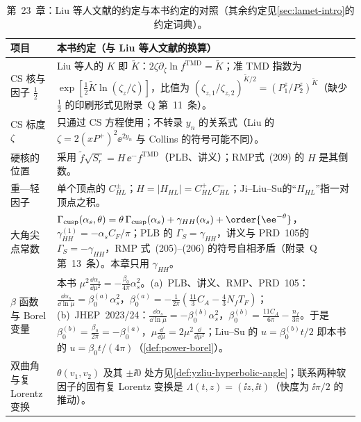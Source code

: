 \begin{table}[htbp]
\centering
\footnotesize
\renewcommand{\arraystretch}{1.1}
\begin{tabularx}{\textwidth}{@{}>{\raggedright\arraybackslash}p{2.0cm}>{\raggedright\arraybackslash}X@{}}
\toprule
项目 & 本书约定（与 Liu 等人文献的换算） \\
\midrule
CS 核与因子 $\frac12$ & Liu 等人的 $K$ 即 $\tilde K$：$2\zeta\partial_\zeta\ln f^{\mathrm{TMD}}=\tilde K$；准 TMD 指数为 $\exp[\frac12\tilde K\ln(\zeta_z/\zeta)]$，比值为 $(\zeta_{z,1}/\zeta_{z,2})^{\tilde K/2}=(P^z_1/P^z_2)^{\tilde K}$（缺少 $\frac12$ 的印刷形式见附录~Q 第~11~条）。 \\
CS 标度 $\zeta$ & 只通过 CS 方程使用；不转录 $y_n$ 的关系式（Liu 的 $\zeta=2(xP^+)^2\ee^{2y_n}$ 与 Collins 的符号可能不同）。 \\
硬核的位置 & 采用 $\tilde f\sqrt{S_r}=H\,\ee^{\cdots}f^{\mathrm{TMD}}$（PLB\cite{Ji:2019ewn}、讲义\cite{Liu:2022nnk}）；RMP\cite{JiEtAl2021}式~(209) 的 $H$ 是其倒数。 \\
重—轻因子 & 单个顶点的 $C^\pm_{HL}$；$H=|H_{HL}|=C^+_{HL}C^-_{HL}$；Ji--Liu--Su\cite{Ji:2023pba}的“$H_{HL}$”指一对顶点之积。 \\
大角尖点常数 & $\Gamma_{\mathrm{cusp}}(\alpha_s,\theta)=\theta\,\Gamma_{\mathrm{cusp}}(\alpha_s)+\gamma_{HH}(\alpha_s)+\order{\ee^{-\theta}}$，$\gamma_{HH}^{(1)}=-\alpha_sC_F/\pi$；PLB 的 $\Gamma_S=\gamma_{HH}$，讲义与 PRD~105\cite{Ji:2021znw}的 $\Gamma_S=-\gamma_{HH}$，RMP 式~(205)--(206) 的符号自相矛盾（附录~Q 第~13~条）。本章只用 $\gamma_{HH}$。 \\
$\beta$ 函数与 Borel 变量 & 本书 $\mu^2\frac{\dd\alpha_s}{\dd\mu^2}=-\frac{\beta_0}{4\pi}\alpha_s^2$。(a)~PLB、讲义、RMP、PRD~105：$\frac{\dd\alpha_s}{\dd\ln\mu}=\beta_0^{(a)}\alpha_s^2$，$\beta_0^{(a)}=-\frac{1}{2\pi}(\frac{11}{3}C_A-\frac43N_fT_F)$；(b)~JHEP~2023/24\cite{Ji:2023pba,Liu:2023onm}：$\frac{\dd\alpha_s}{\dd\ln\mu}=-\beta_0^{(b)}\alpha_s^2$，$\beta_0^{(b)}=\frac{11C_A}{6\pi}-\frac{n_f}{3\pi}$。于是 $\beta_0^{(b)}=\frac{\beta_0}{2\pi}=-\beta_0^{(a)}$，$\mu\frac{\dd}{\dd\mu}=2\mu^2\frac{\dd}{\dd\mu^2}$；Liu--Su 的 $u=\beta_0^{(b)}t/2$ 即本书的 $u=\beta_0t/(4\pi)$（\cref{def:power-borel}）。 \\
双曲角与复 Lorentz 变换 & $\theta(v_1,v_2)$ 及其 $\pm\ii0$ 处方见\cref{def:yzliu-hyperbolic-angle}；联系两种软因子的固有复 Lorentz 变换是 $\Lambda(t,z)=(\ii z,\ii t)$（快度为 $\ii\pi/2$ 的推动）。 \\
\bottomrule
\end{tabularx}
\caption{第~23~章：Liu 等人文献的约定与本书约定的对照（其余约定见\cref{sec:lamet-intro}的约定词典）。}
\label{tab:yzliu-conventions}
\end{table}

